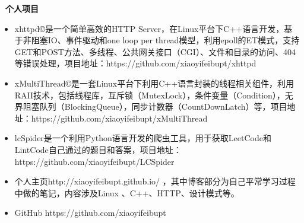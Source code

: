 \documentclass[a4paper,oneside,UTF8, winfonts]{ctexart}
\begin{document}
\noindent \textbf{ \heiti \faCode\ 个人项目}
\begin{itemize}[topsep=0.3em, leftmargin=3pc]
  \setlength{\itemsep}{0pt}
  \setlength{\parsep}{4pt}
  \setlength{\parskip}{4pt}
  \item {}xhttpd©是一个简单高效的HTTP Server，在Linux平台下C++语言开发，基于非阻塞IO、事件驱动和one loop per thread模型，利用epoll的ET模式，支持GET和POST方法、多线程、公共网关接口（CGI）、文件和目录的访问、404等错误处理，项目地址：https://github.com/xiaoyifeibupt/xhttpd
  \item {}xMultiThread©是一套Linux平台下利用C++语言封装的线程相关组件，利用RAII技术，包括线程库，互斥锁（MutexLock），条件变量（Condition），无界阻塞队列（BlockingQueue），同步计数器（CountDownLatch）等，项目地址：https://github.com/xiaoyifeibupt/xMultiThread
  \item {}lcSpider是一个利用Python语言开发的爬虫工具，用于获取LeetCode和LintCode自己通过的题目和答案，项目地址：https://github.com/xiaoyifeibupt/LCSpider
  \item {}个人主页http://xiaoyifeibupt.github.io/ ，其中博客部分为自己平常学习过程中做的笔记，内容涉及Linux 、C++、HTTP、设计模式等。
  \item {}GitHub https://github.com/xiaoyifeibupt
\end{itemize}
\end{document}
